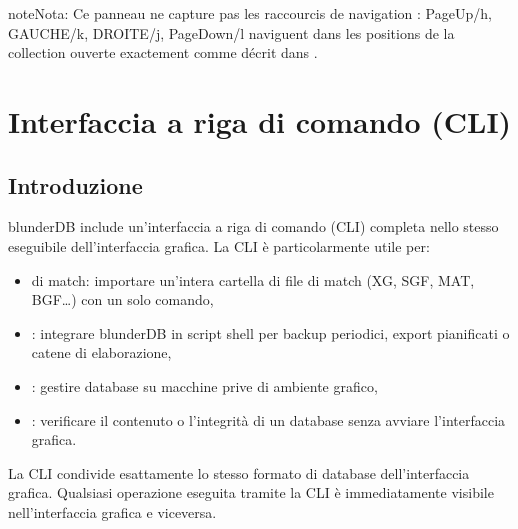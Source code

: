 \documentclass[letterpaper,10pt,italian]{sphinxmanual}
\begin{document}
\begin{sphinxadmonition}{note}{Nota:}
\sphinxAtStartPar
Ce panneau ne capture pas les raccourcis de navigation :
PageUp/h, GAUCHE/k, DROITE/j, PageDown/l naviguent dans les positions de
la collection ouverte exactement comme décrit dans
{\hyperref[\detokenize{raccourcis:raccourcis-navigation}]{}}.
\end{sphinxadmonition}

\sphinxstepscope


\section{Interfaccia a riga di comando (CLI)}
\label{\detokenize{cli:interface-en-ligne-de-commande-cli}}\label{\detokenize{cli:cli}}\label{\detokenize{cli::doc}}

\subsection{Introduzione}
\label{\detokenize{cli:introduction}}
\sphinxAtStartPar
blunderDB include un’interfaccia a riga di comando (CLI) completa nello stesso eseguibile dell’interfaccia grafica. La CLI è particolarmente utile per:
\begin{itemize}
\item {} 
\sphinxAtStartPar
{} di match: importare un’intera cartella di file di match (XG, SGF, MAT, BGF…) con un solo comando,

\item {} 
\sphinxAtStartPar
{}: integrare blunderDB in script shell per backup periodici, export pianificati o catene di elaborazione,

\item {} 
\sphinxAtStartPar
{}: gestire database su macchine prive di ambiente grafico,

\item {} 
\sphinxAtStartPar
{}: verificare il contenuto o l’integrità di un database senza avviare l’interfaccia grafica.

\end{itemize}

\sphinxAtStartPar
La CLI condivide esattamente lo stesso formato di database dell’interfaccia grafica. Qualsiasi operazione eseguita tramite la CLI è immediatamente visibile nell’interfaccia grafica e viceversa.
\end{document}
